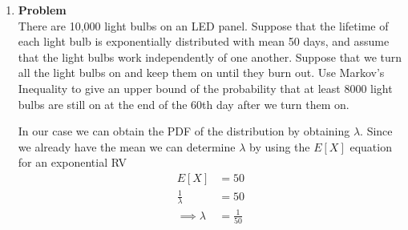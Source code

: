 \documentclass[12pt]{article}
\newenvironment{Ex}{\textbf{Problem}\vspace{.75em}\\}{}
\begin{document}
\begin{enumerate}
\begin{Ex}
    \begin{solution} \hfill \vspace{.75em} \\
      Chebyshev's Inequality states that
      \begin{equation}
        \label{eq:6-chebyshev-decl}
        P(|X-\mu_X| > d) \le \frac{\sigma_X^2}{d^2}
      \end{equation}
    \end{solution}
    Since the lower and upper bounds of the requested probability is
    centered equally about the mean, this is a perfect candidate for
    Chebyshev's inequality.
    \begin{equation}
      \label{eq:6-chebyshev}
      \begin{aligned}
        P(5<X<15) &= P(|X-10| < 5) \\
        &= 1 - P(|X-10|\ge 5) \\
        &\le 1 - \frac{\sigma_X^2}{d^2} \\
        &\le 1 - \frac{10}{25} \\
        \implies P(5<X<15) &\le 0.6 \\
      \end{aligned}
    \end{equation}
  \end{Ex}
\item
  \begin{Ex}
    There are 10,000 light bulbs on an LED panel. Suppose that the
    lifetime of each light bulb is exponentially distributed with mean
    50 days, and assume that the light bulbs work independently of one
    another. Suppose that we turn all the light bulbs on and keep them
    on until they burn out. Use Markov's Inequality to give an upper
    bound of the probability that at least 8000 light bulbs are still
    on at the end of the 60th day after we turn them on.
    \begin{solution} \hfill
      In our case we can obtain the PDF of the distribution by
      obtaining $\lambda$. Since we already have the mean we can
      determine $\lambda$ by using the $E[X]$ equation for an
      exponential RV
      \begin{equation}
        \label{eq:7-lambda}
        \begin{aligned}
          E[X] &= 50 \\
          \frac{1}{\lambda} &= 50 \\
          \implies \lambda &= \frac{1}{50} \\
        \end{aligned}

\end{equation}
\end{solution}
\end{Ex}
\end{enumerate}
\end{document}

